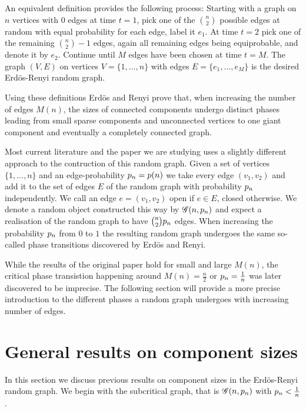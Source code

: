 An equivalent definition provides the following process:
Starting with a graph on $n$ vertices with $0$ edges at time $t=1$, 
pick one of the $\binom{n}{2}$ possible edges at random with equal probability for each edge,
label it $e_1$.
At time $t=2$ pick one of the remaining $\binom{n}{2}-1$ edges, again all remaining edges being equiprobable,
and denote it by $e_2$.
Continue until $M$ edges have been chosen at time $t=M$.
The graph $(V,E)$ on vertices $V = \{1, \dots, n\}$ with edges $E = \{e_1, \dots, e_M\}$ is the desired Erdös-Renyi random graph.

Using these definitions Erdös and Renyi prove that,
when increasing the number of edges $M(n)$,
the sizes of connected components undergo distinct phases leading from small sparse components and unconnected vertices
to one giant component and eventually a completely connected graph.

Most current literature and the paper we are studying uses a slightly different approach to the contruction of this random graph.
Given a set of vertices $\{1, \dots, n\}$ and an edge-probability $p_n = p(n)$
we take every edge $(v_1, v_2)$ and add it to the set of edges $E$ of the random graph with probability $p_n$ independently.
We call an edge $e = (v_1, v_2)$ open if $e \in E$, closed otherwise.
We denote a random object constructed this way by $\mathscr{G}(n, p_n)$ and expect a realisation of the random graph to have $\binom{n}{2}p_n$ edges.
When increasing the probability $p_n$ from $0$ to $1$ the resulting random graph undergoes the same so-called phase transitions
discovered by Erdös and Renyi.

While the results of the original paper hold for small and large $M(n)$,
the critical phase transistion happening around $M(n) = \frac{n}{2}$ or $p_n = \frac{1}{n}$
was later discovered to be imprecise.
The following section will provide a more precise introduction to the different phases a random graph undergoes
with increasing number of edges.


\section{General results on component sizes}

In this section we discuss previous results on component sizes in the Erdös-Renyi random graph.
We begin with the subcritical graph, that is
$\mathscr{G}(n, p_n)$ with $p_n < \frac{1}{n}$.

